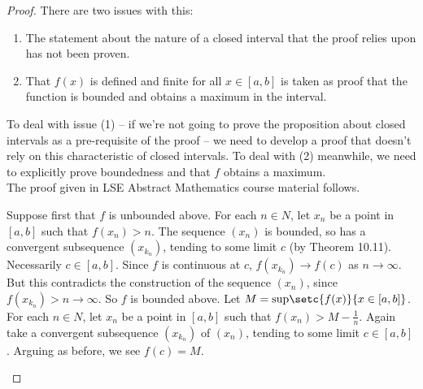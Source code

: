 \documentclass[../MathsNotesBase.tex]{subfiles}
\begin{document}
\begin{proof}
		There are two issues with this:
		\begin{enumerate}
			\item{The statement about the nature of a closed interval that the proof relies upon has not been proven.}
			\item{That $f(x)$ is defined and finite for all ${ x \in [a,b] }$ is taken as proof that the function is bounded and obtains a maximum in the interval.}
		\end{enumerate}
		To deal with issue (1) -- if we're not going to prove the proposition about closed intervals as a pre-requisite of the proof -- we need to develop a proof that doesn't rely on this characteristic of closed intervals. To deal with (2) meanwhile, we need to explicitly prove boundedness and that $f$ obtains a maximum.\\
		The proof given in LSE Abstract Mathematics course material follows.\\
		
		\begin{displayquote}
		Suppose first that $ f $ is unbounded above. For each ${ n \in N }$, let $ x_n $ be a point in ${ [a, b] }$ such that ${ f(x_n) > n }$. The sequence $ (x_n) $ is bounded, so has a convergent subsequence ${ (x_{k_n}) }$, tending to some limit $ c $ (by Theorem 10.11). Necessarily ${ c \in [a, b] }$. Since $ f $ is continuous at $ c $, ${ f(x_{k_n}) \to f(c) }$ as ${ n \to \infty }$. But this contradicts the construction of the sequence $ (x_n) $, since ${ f(x_{k_n}) > n \to \infty }$. So $ f $ is bounded above. Let ${ M = \text{sup}\setc{f(x)}{x \in [a, b]} }$. For each ${ n \in N }$, let $ x_n $ be a point in ${ [a, b] }$ such that ${ f(x_n) > M - \frac{1}{n} }$. Again take a convergent subsequence ${ (x_{k_n}) }$ of $ (x_n) $, tending to some limit ${ c \in [a, b] }$. Arguing as before, we see ${ f(c) = M }$.
		\end{displayquote}
	

\end{proof}
\end{document}
